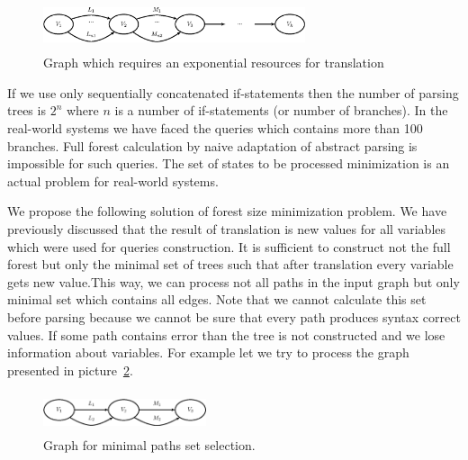 \begin{figure}
    \begin{center}
        \includegraphics[width=7.7cm,height=1.5cm]{graphs/big_res.eps}
        \caption{Graph which requires an exponential resources for translation}
        \label{pic5}
    \end{center}
\end{figure}

If we use only sequentially concatenated if-statements then the number of parsing trees is $2^n$ 
where $n$ is a number of if-statements (or number of branches). In the real-world systems we 
have faced the queries which contains more than 100 branches. Full forest calculation by naive 
adaptation of abstract parsing is impossible for such queries. The set of states to be processed
 minimization is an actual problem for real-world systems.


We propose the following solution of forest size minimization problem. We have previously discussed 
that the result of translation is new values for all variables which were used for queries construction. 
It is sufficient to construct not the full forest but only the minimal set of trees such that after 
translation every variable gets new value.This way, we can process not all paths in the input graph 
but only minimal set which contains all edges. Note that we cannot calculate this set before parsing 
because we cannot be sure that every path produces syntax correct values. If some path contains 
error than the tree is not constructed and we lose information about variables. For example let
we try to process the graph presented in picture~\ref{pic6}.

\begin{figure}
    \begin{center}
        \includegraphics[width=4.8cm,height=1.2cm]{graphs/paths.eps}
        \caption{Graph for minimal paths set selection.}
        \label{pic6}
    \end{center}
\end{figure}

